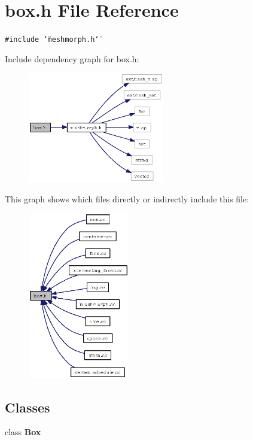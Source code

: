 \section{box.h File Reference}
\label{box_8h}
{\tt \#include \char`\"{}meshmorph.h\char`\"{}}\par


Include dependency graph for box.h:\begin{figure}[H]
\begin{center}
\leavevmode
\includegraphics[width=169pt]{box_8h__incl}
\end{center}
\end{figure}


This graph shows which files directly or indirectly include this file:\begin{figure}[H]
\begin{center}
\leavevmode
\includegraphics[width=125pt]{box_8h__dep__incl}
\end{center}
\end{figure}
\subsection*{Classes}
\begin{CompactItemize}
\item 
class {\bf Box}
\end{CompactItemize}
